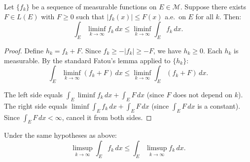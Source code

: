 \documentclass[11pt]{report}
\begin{document}
\begin{thmbox}
Let $\{f_k\}$ be a sequence of measurable functions on $E \in \mathcal{M}$. Suppose there exists $F \in L(E)$ with $F \geq 0$ such that $|f_k(x)| \leq F(x)$ a.e.\ on $E$ for all $k$. Then:
\[
\int_E \liminf_{k \to \infty} f_k\,dx \leq \liminf_{k \to \infty} \int_E f_k\,dx.
\]
\end{thmbox}

\begin{proof}
Define $h_k = f_k + F$. Since $f_k \geq -|f_k| \geq -F$, we have $h_k \geq 0$. Each $h_k$ is measurable. By the standard Fatou's lemma applied to $\{h_k\}$:
\[
\int_E \liminf_{k \to \infty} (f_k + F)\,dx \leq \liminf_{k \to \infty} \int_E (f_k + F)\,dx.
\]

The left side equals $\int_E \liminf f_k\,dx + \int_E F\,dx$ (since $F$ does not depend on $k$). The right side equals $\liminf \int_E f_k\,dx + \int_E F\,dx$ (since $\int_E F\,dx$ is a constant). Since $\int_E F\,dx < \infty$, cancel it from both sides.
\end{proof}

\begin{thmbox}
Under the same hypotheses as above:
\[
\limsup_{k \to \infty} \int_E f_k\,dx \leq \int_E \limsup_{k \to \infty} f_k\,dx.
\]
\end{thmbox}
\end{document}
